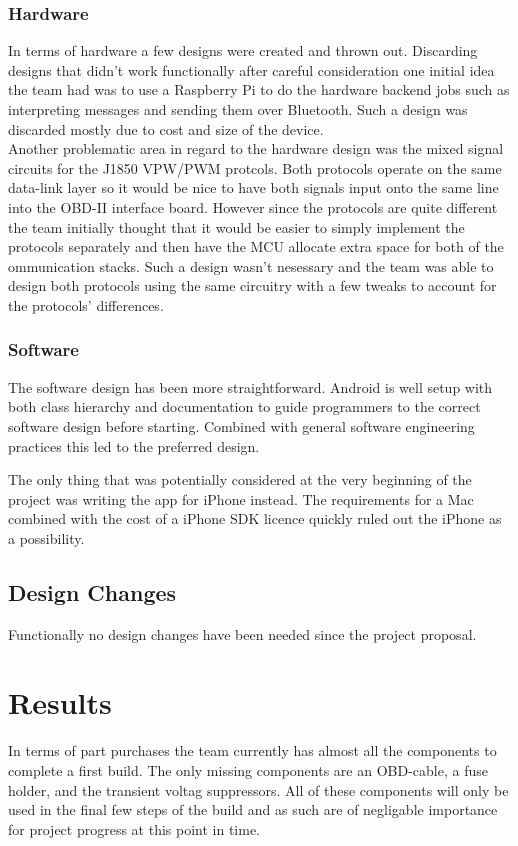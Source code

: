 \documentclass[12pt,letterpaper]{article}
\begin{document}
\subsubsection{Hardware}
In terms of hardware a few designs were created and thrown out. Discarding designs that didn't work functionally after careful consideration one initial idea the team had was to use a Raspberry Pi to do the hardware backend jobs such as interpreting messages and sending them over Bluetooth. Such a design was discarded mostly due to cost and size of the device.\\ 

Another problematic area in regard to the hardware design was the mixed signal circuits for the J1850 VPW/PWM protcols. Both protocols operate on the same data-link layer so it would be nice to have both signals input onto the same line into the OBD-II interface board. However since the protocols are quite different the team initially thought that it would be easier to simply implement the protocols separately and then have the MCU allocate extra space for both of the ommunication stacks. Such a design wasn't nesessary and the team was able to design both protocols using the same circuitry with a few tweaks to account for the protocols' differences.

\subsubsection{Software}
The software design has been more straightforward. Android is well setup with both class hierarchy and documentation to guide programmers to the correct software design before starting. Combined with general software engineering practices this led to the preferred design. 

The only thing that was potentially considered at the very beginning of the project was writing the app for iPhone instead. The requirements for a Mac combined with the cost of a iPhone SDK licence quickly ruled out the iPhone as a possibility. 


\subsection{Design Changes}
Functionally no design changes have been needed since the project proposal.

\section{Results}
In terms of part purchases the team currently has almost all the components to complete a first build. The only missing components are an OBD-cable, a fuse holder, and the transient voltag suppressors. All of these components will only be used in the final few steps of the build and as such are of negligable importance for project progress at this point in time. \\
\end{document}
